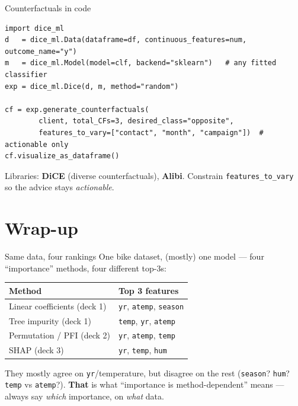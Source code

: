 \documentclass[aspectratio=169]{beamer}
\begin{document}
\begin{frame}[fragile]{Counterfactuals in code}
\begin{lstlisting}
import dice_ml
d   = dice_ml.Data(dataframe=df, continuous_features=num, outcome_name="y")
m   = dice_ml.Model(model=clf, backend="sklearn")   # any fitted classifier
exp = dice_ml.Dice(d, m, method="random")

cf = exp.generate_counterfactuals(
        client, total_CFs=3, desired_class="opposite",
        features_to_vary=["contact", "month", "campaign"])  # actionable only
cf.visualize_as_dataframe()
\end{lstlisting}
  \vskip 2pt
  \footnotesize Libraries: \textbf{DiCE} (diverse counterfactuals), \textbf{Alibi}. Constrain
  \texttt{features\_to\_vary} so the advice stays \emph{actionable}.
\end{frame}

\section*{Wrap-up}

\begin{frame}{Same data, four rankings}
  One bike dataset, (mostly) one model --- four ``importance'' methods, four different top-3s:
  \vskip 4pt
  \begin{center}\small
    \renewcommand{\arraystretch}{1.3}
    \begin{tabular}{l l}
      \textbf{Method} & \textbf{Top 3 features} \\
      \hline
      Linear coefficients (deck 1) & \texttt{yr}, \texttt{atemp}, \texttt{season} \\
      Tree impurity (deck 1) & \texttt{temp}, \texttt{yr}, \texttt{atemp} \\
      Permutation / PFI (deck 2) & \texttt{yr}, \texttt{atemp}, \texttt{temp} \\
      SHAP (deck 3) & \texttt{yr}, \texttt{temp}, \texttt{hum} \\
      \hline
    \end{tabular}
  \end{center}
  \vskip 4pt
  \footnotesize They mostly agree on \texttt{yr}/temperature, but disagree on the rest
  (\texttt{season}? \texttt{hum}? \texttt{temp} vs \texttt{atemp}?). \textbf{That} is what
  ``importance is method-dependent'' means --- always say \emph{which} importance, on \emph{what} data.
\end{frame}
\end{document}
